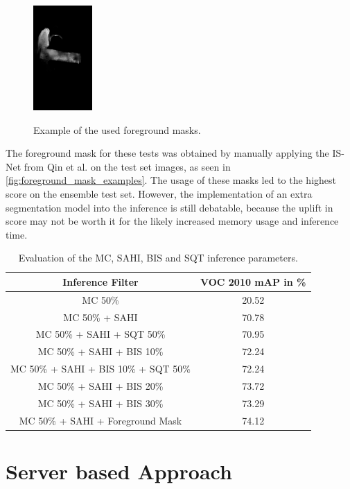 \documentclass[10pt]{book}
\newcommand{\figureref}[1]{\autoref{#1}}
\begin{document}
\begin{figure}
     {\includegraphics[width=0.2\textwidth]{image/foreground_mask_example_hand_mask}}
  \caption{Example of the used foreground masks.}
  \label{fig:foreground_mask_examples}
\end{figure}

The foreground mask for these tests was obtained by manually applying the IS-Net from Qin et al. \cite{qin2022} on the test set images, as seen in \figureref{fig:foreground_mask_examples}. The usage of these masks led to the highest score on the ensemble test set. However, the implementation of an extra segmentation model into the inference is still debatable, because the uplift in score may not be worth it for the likely increased memory usage and inference time.

\begin{table}
  \begin{tabular}{ c c }
   Inference Filter & VOC 2010 \ac{mAP} in \% \\ 
   \hline
   \ac{MC} 50\% & 20.52 \\
   \ac{MC} 50\% + \ac{SAHI} & 70.78 \\
   \ac{MC} 50\% + \ac{SAHI} + \ac{SQT} 50\% & 70.95 \\
   \ac{MC} 50\% + \ac{SAHI} + \ac{BIS} 10\% & 72.24 \\
   \ac{MC} 50\% + \ac{SAHI} + \ac{BIS} 10\% + \ac{SQT} 50\% & 72.24 \\
   \ac{MC} 50\% + \ac{SAHI} + \ac{BIS} 20\% & 73.72 \\
   \ac{MC} 50\% + \ac{SAHI} + \ac{BIS} 30\% & 73.29 \\
   \ac{MC} 50\% + \ac{SAHI} + Foreground Mask & 74.12 \\
   \hline
  \end{tabular}
  \caption{\label{tab:inference_parameters}Evaluation of the \ac{MC}, \ac{SAHI}, \ac{BIS} and \ac{SQT} inference parameters.}
\end{table} %

\section{Server based Approach}
\end{document}
